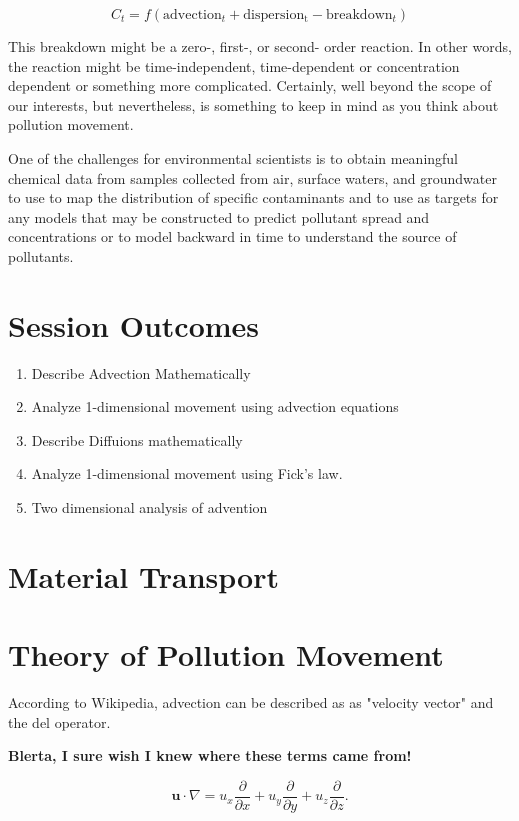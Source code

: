 \documentclass{tufte-handout}
\begin{document}
\begin{equation}
C_t = f(\mathrm{advection}_t + \mathrm{dispersion_t} - \mathrm{breakdown}_t)
\end{equation}

This breakdown might be a zero-, first-, or second- order reaction. In other words, the reaction might be time-independent, time-dependent or concentration dependent or something more complicated. Certainly, well beyond the scope of our interests, but nevertheless, is something to keep in mind as you think about pollution movement. 

One of the challenges for environmental scientists is to obtain meaningful chemical data from samples collected from air, surface waters, and groundwater to use to map the distribution of specific contaminants and to use as targets for any models that may be constructed to predict pollutant spread and concentrations or to model backward in time to understand the source of pollutants. 

\section{Session Outcomes}
\begin{enumerate}
	\item Describe Advection Mathematically
	\item Analyze 1-dimensional movement using advection equations
	\item Describe Diffuions mathematically
	\item Analyze 1-dimensional movement using Fick's law.
	\item Two dimensional analysis of advention
\end{enumerate}

\section{Material Transport}

\section{Theory of Pollution Movement}

According to Wikipedia, advection can be described as as "velocity vector" and the del operator.

\textbf{Blerta, I sure wish I knew where these terms came from!}

\begin{equation}
\mathbf{u} \cdot \nabla = u_x \frac{\partial}{\partial x} + u_y \frac{\partial}{\partial y} + u_z \frac{\partial}{\partial z}.
\end{equation}
\end{document}
